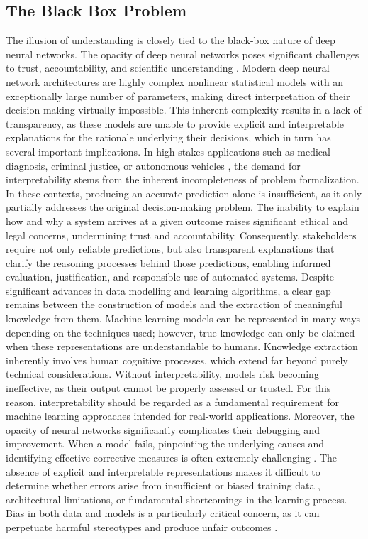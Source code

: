 \documentclass[12pt,a4paper]{report}
\begin{document}
\subsection{The Black Box Problem}
The illusion of understanding is closely tied to the black-box nature of deep neural networks. The opacity of deep neural networks poses significant challenges to trust, accountability, and scientific understanding \cite{chiave5, chiave14}. Modern deep neural network architectures are highly complex nonlinear statistical models with an exceptionally large number of parameters, making direct interpretation of their decision-making virtually impossible. This inherent complexity results in a lack of transparency, as these models are unable to provide explicit and interpretable explanations for the rationale underlying their decisions, which in turn has several important implications.
In high-stakes applications such as medical diagnosis, criminal justice, or autonomous vehicles \cite{chiave5,chiave16}, the demand for interpretability stems from the inherent incompleteness of problem formalization. In these contexts, producing an accurate prediction alone is insufficient, as it only partially addresses the original decision-making problem. The inability to explain how and why \cite{chiave25} a system arrives at a given outcome raises significant ethical and legal concerns, undermining trust and accountability. Consequently, stakeholders require not only reliable predictions, but also transparent explanations that clarify the reasoning processes behind those predictions, enabling informed evaluation, justification, and responsible use of automated systems.
Despite significant advances in data modelling and learning algorithms, a clear gap remains between the construction of models and the extraction of meaningful knowledge from them. Machine learning models can be represented in many ways depending on the techniques used; however, true knowledge can only be claimed when these representations are understandable to humans. Knowledge extraction inherently involves human cognitive processes, which extend far beyond purely technical considerations. Without interpretability, models risk becoming ineffective, as their output cannot be properly assessed or trusted. For this reason, interpretability should be regarded as a fundamental requirement \cite{chiave11} for machine learning approaches intended for real-world applications.
Moreover, the opacity of neural networks significantly complicates their debugging and improvement. When a model fails, pinpointing the underlying causes and identifying effective corrective measures is often extremely challenging \cite{chiave13}. The absence of explicit and interpretable representations makes it difficult to determine whether errors arise from insufficient or biased training data \cite{chiave25}, architectural limitations, or fundamental shortcomings in the learning process. Bias in both data and models is a particularly critical concern, as it can perpetuate harmful stereotypes and produce unfair outcomes \cite{chiave30}.
\end{document}
